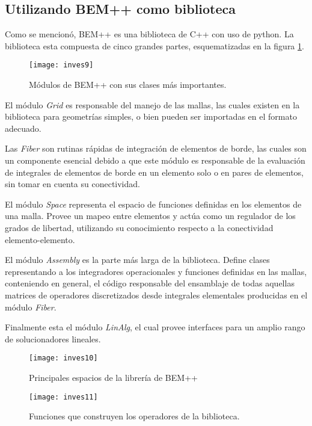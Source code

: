 \documentclass[12pt,letterpaper]{article}
\numberwithin{equation}{section}
\begin{document}
\subsection{Utilizando BEM++ como biblioteca}
Como se mencionó, BEM++ es una biblioteca de C++ con uso de python. La biblioteca esta compuesta de cinco grandes partes, esquematizadas en la figura \ref{bempp}. 

\begin{figure}[H]
	\centering
	\texttt{[image: inves9]}
	\caption{Módulos de BEM++ con sus clases más importantes.}
	\label{bempp}
\end{figure}

El módulo \textit{Grid} es responsable del manejo de las mallas, las cuales existen en la biblioteca para geometrías simples, o bien pueden ser importadas en el formato adecuado.

Las \textit{Fiber} son rutinas rápidas de integración de elementos de borde, las cuales son un componente esencial debido a que este módulo es responsable de la evaluación de integrales de elementos de borde en un elemento solo o en pares de elementos, sin tomar en cuenta su conectividad. 

El módulo \textit{Space} representa el espacio de funciones definidas en los elementos de una malla. Provee un mapeo entre elementos y actúa como un regulador de los grados de libertad, utilizando su conocimiento respecto a la conectividad elemento-elemento.

El módulo \textit{Assembly} es la parte más larga de la biblioteca. Define clases representando a los integradores operacionales y funciones definidas en las mallas, conteniendo en general, el código responsable del ensamblaje de todas aquellas matrices de operadores discretizados desde integrales elementales producidas en el módulo \textit{Fiber}.

Finalmente esta el módulo \textit{LinAlg}, el cual provee interfaces para un amplio rango de solucionadores lineales.


\begin{figure}[H]
	\centering
	\texttt{[image: inves10]}
	\caption{Principales espacios de la librería de BEM++}
\end{figure}

\begin{figure}[H]
	\centering
	\texttt{[image: inves11]}
	\caption{Funciones que construyen los operadores de la biblioteca.}
\end{figure}
\end{document}
